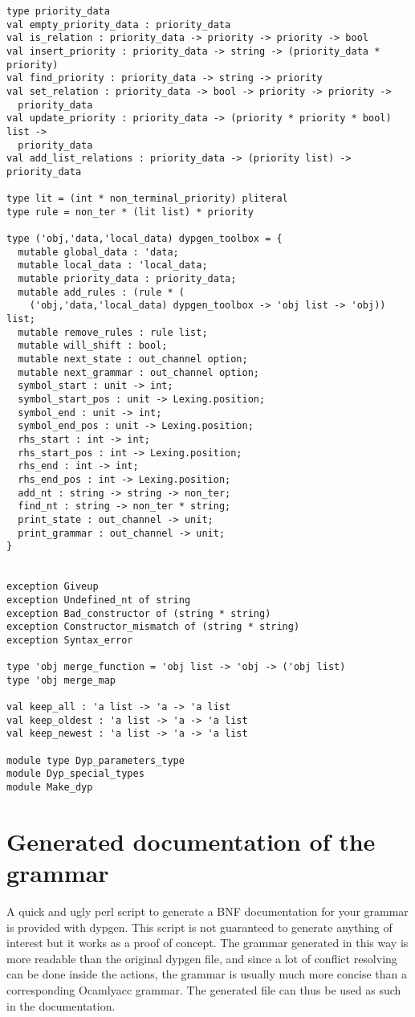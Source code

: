 \documentclass[12pt]{article}
\begin{document}
{\begin{verbatim}
type priority_data
val empty_priority_data : priority_data
val is_relation : priority_data -> priority -> priority -> bool
val insert_priority : priority_data -> string -> (priority_data * priority)
val find_priority : priority_data -> string -> priority
val set_relation : priority_data -> bool -> priority -> priority ->
  priority_data
val update_priority : priority_data -> (priority * priority * bool) list ->
  priority_data
val add_list_relations : priority_data -> (priority list) -> priority_data

type lit = (int * non_terminal_priority) pliteral
type rule = non_ter * (lit list) * priority

type ('obj,'data,'local_data) dypgen_toolbox = {
  mutable global_data : 'data;
  mutable local_data : 'local_data;
  mutable priority_data : priority_data;
  mutable add_rules : (rule * (
    ('obj,'data,'local_data) dypgen_toolbox -> 'obj list -> 'obj)) list;
  mutable remove_rules : rule list;
  mutable will_shift : bool;
  mutable next_state : out_channel option;
  mutable next_grammar : out_channel option;
  symbol_start : unit -> int;
  symbol_start_pos : unit -> Lexing.position;
  symbol_end : unit -> int;
  symbol_end_pos : unit -> Lexing.position;
  rhs_start : int -> int;
  rhs_start_pos : int -> Lexing.position;
  rhs_end : int -> int;
  rhs_end_pos : int -> Lexing.position;
  add_nt : string -> string -> non_ter;
  find_nt : string -> non_ter * string;
  print_state : out_channel -> unit;
  print_grammar : out_channel -> unit;
}


exception Giveup
exception Undefined_nt of string
exception Bad_constructor of (string * string)
exception Constructor_mismatch of (string * string)
exception Syntax_error

type 'obj merge_function = 'obj list -> 'obj -> ('obj list)
type 'obj merge_map

val keep_all : 'a list -> 'a -> 'a list
val keep_oldest : 'a list -> 'a -> 'a list
val keep_newest : 'a list -> 'a -> 'a list

module type Dyp_parameters_type
module Dyp_special_types
module Make_dyp
\end{verbatim}

\section{Generated documentation of the grammar}

A quick and ugly perl script to generate a BNF documentation for your grammar
is provided with dypgen. This script is not guaranteed to generate anything of
interest but it works as a proof of concept. The grammar generated in this way
is more readable than the original dypgen file, and since a lot of conflict
resolving can be done inside the actions, the grammar is usually much more
concise than a corresponding Ocamlyacc grammar. The generated file can thus be
used as such in the documentation.

}
\end{document}

